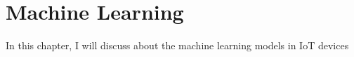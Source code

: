 \chapter{Machine Learning}\label{C:MachineLearning}
In this chapter, I will discuss about the machine learning models in IoT devices

